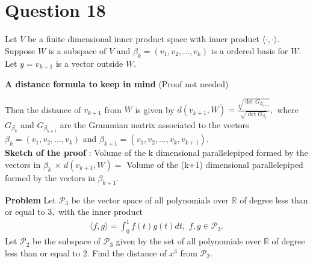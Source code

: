 \section{Question 18}

\horz

Let $V$ be a finite dimensional inner product space with inner product $\langle\cdot ,\cdot \rangle.$ Suppose $W$ is a subspace of $V$ and $\beta_k=(v_1,v_2,\ldots,v_k)$ is a ordered basis for $W.$ Let $y=v_{k+1}$ is a vector outside $W.$
\begin{center}
\textbf{A distance formula to keep in mind} (Proof not needed)
\end{center}
Then the distance of $v_{k+1}$ from $W$ is given by $d(v_{k+1},W)= \frac{\sqrt{\det G_{\beta_{k+1}}}}{\sqrt{\det G_{\beta_k}}},$ where $G_{\beta_k}$ and $G_{\beta_{k+1}}$ are the Grammian matrix associated to the vectors $\beta_k=(v_1,v_2,\ldots,v_k)$ and $\beta_{k+1}=(v_1,v_2,\ldots,v_k,v_{k+1}).$\\

{\textbf{Sketch of the proof}} : Volume of the k dimensional parallelepiped formed by the vectors in $\beta_k$ $\times \,\, d(v_{k+1},W) = $ Volume of the (k+1) dimensional parallelepiped formed by the vectors in $\beta_{k+1}.$


\textbf{Problem}
Let $\mathcal P_3$ be the vector space of all polynomials over $\mathbb R$ of degree less than or equal to $3,$ with the inner product 
\begin{align*}
\langle f,g\rangle = \int_{0}^1f(t)g(t)dt,\,\,f,g\in \mathcal P_3.
\end{align*} 
Let $\mathcal P_2$ be the subspace of  $\mathcal P_3$ given by the set of all polynomials over $\mathbb R$ of degree less than or equal to $2.$ Find the distance of $x^3$ from $\mathcal P_2.$

\horz
